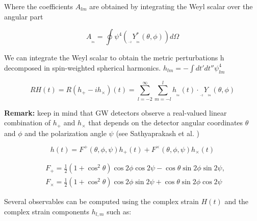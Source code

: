 Where the coefficients $A_{lm}$ are obtained by integrating the Weyl scalar over the angular  part

\begin{equation}
A_{_{_{lm}}} = \oint \psi^4({}_{_{_{-2}}}Y^{*}_{_{_{lm}}}(\theta, \phi)) d\Omega
\end{equation}

We can integrate the Weyl scalar to obtain the metric perturbations h decomposed in spin-weighted spherical harmonics.
$ h_{lm} = - \int dt' dt'' \psi_{lm}^4$
 
\begin{equation}\label{fvr}
RH(t) = R(h_+ - ih_{\times})(t) = \sum_{l=-2}^{\infty}  \sum_{m=-l}^{l} h_{_{_{lm}}}(t) \cdot {}_{_{_{-2}}}Y_{_{_{lm}}}(\theta, \phi)
\end{equation}

\begin{mdframed}
\textbf{Remark:} keep in mind that  GW detectors observe a real-valued linear combination of $h_+$ and $h_\times$ that depends on the detector angular coordinates $\theta$ and $\phi$  and the polarization angle $\psi$ (see Sathyaprakash et al. \cite[section 4.2.1]{Sathyaprakash:2009xs})

\begin{equation}
h(t) = F^{+}(\theta, \phi, \psi) h_+(t) + F^{\times}(\theta, \phi, \psi) h_{\times}(t)
\end{equation}

\begin{equation}
\begin{aligned}
& F_{+}=\frac{1}{2}\left(1+\cos ^2 \theta\right) \cos 2 \phi \cos 2 \psi-\cos \theta \sin 2 \phi \sin 2 \psi, \\
& F_{\times}=\frac{1}{2}\left(1+\cos ^2 \theta\right) \cos 2 \phi \sin 2 \psi+\cos \theta \sin 2 \phi \cos 2 \psi
\end{aligned}
\end{equation}
\end{mdframed}


Several observables can be computed using the complex strain $H(t)$ and the complex strain components $h_{l,m}$ such as:

